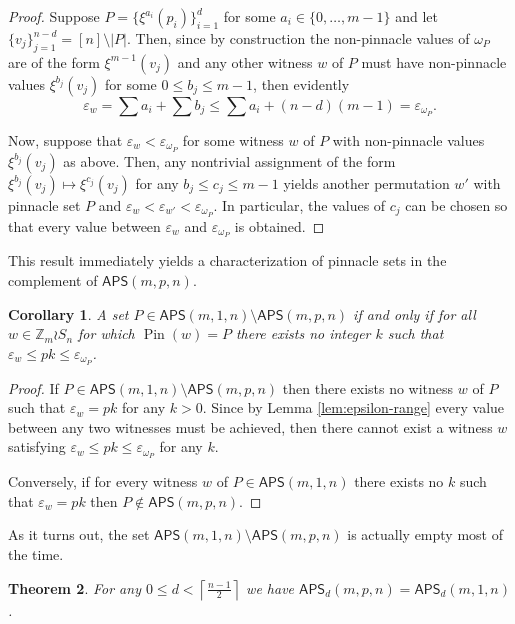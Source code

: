 \documentclass[12pt,reqno]{amsart}
\numberwithin{equation}{section}
\theoremstyle{plain}
\newtheorem{theorem}{Theorem}[section]
\newtheorem{corollary}[theorem]{Corollary}
\theoremstyle{definition}
\theoremstyle{remark}
\newcommand{\Z}{\mathbb{Z}}
\newcommand{\Pin}{\operatorname{Pin}}
\newcommand\APS{\mathsf{APS}}
\newcommand{\ceil}[1]{\left\lceil#1\right\rceil}
\begin{document}
\begin{proof}
Suppose $P = \{\xi^{a_i}(p_i)\}_{i=1}^d$ for some $a_i \in \{0,\dots,m-1\}$ and let $\{v_j\}_{j=1}^{n-d}=[n]\setminus|P|$. Then, since by construction the non-pinnacle values of $\omega_P$ are of the form $\xi^{m-1}(v_j)$ and any other witness $w$ of $P$ must have non-pinnacle values $\xi^{b_j}(v_j)$ for some $0\leq b_j\leq m-1$, then evidently 
\[\varepsilon_w = \sum a_i + \sum b_j \leq \sum a_i + (n-d)(m-1) = \varepsilon_{\omega_P}.\] 

Now, suppose that $\varepsilon_w < \varepsilon_{\omega_P}$ for some witness $w$ of $P$ with non-pinnacle values $\xi^{b_j}(v_j)$ as above. Then, any nontrivial assignment of the form $\xi^{b_j}(v_j) \mapsto \xi^{c_j}(v_j)$ for any $b_j\leq c_j \leq m-1$ yields another permutation $w'$ with pinnacle set $P$ and $\varepsilon_w < \varepsilon_{w'}<\varepsilon_{\omega_P}$. In particular, the values of $c_j$ can be chosen so that every value between $\varepsilon_w$ and $\varepsilon_{\omega_P}$ is obtained. 
\end{proof}

This result immediately yields a characterization of pinnacle sets in the complement of $\APS(m,p,n)$.

\begin{corollary}
A set $P \in \APS(m,1,n)\setminus\APS(m,p,n)$ if and only if for all $w \in \Z_m \wr S_{n}$ for which $\Pin(w)=P$ there exists no integer $k$ such that $\varepsilon_w \leq pk \leq \varepsilon_{\omega_P}$.
\end{corollary}

\begin{proof}
If $P \in \APS(m,1,n)\setminus\APS(m,p,n)$ then there exists no witness $w$ of $P$ such that $\varepsilon_w =pk$ for any $k>0$. Since by Lemma \ref{lem:epsilon-range} every value between any two witnesses must be achieved, then there cannot exist a witness $w$ satisfying $\varepsilon_w \leq pk \leq \varepsilon_{\omega_P}$ for any $k$. 

Conversely, if for every witness $w$ of $P \in \APS(m,1,n)$ there exists no $k$ such that $\varepsilon_w=pk$ then $P \notin \APS(m,p,n)$.
\end{proof}

As it turns out, the set $\APS(m,1,n)\setminus\APS(m,p,n)$ is actually empty most of the time. 

\begin{theorem} \label{thm:APS-complex-equal}
    For any $0 \leq d  < \ceil{\frac{n-1}{2}}$ we have $\APS_d(m, p, n) = \APS_d(m, 1, n)$.
\end{theorem}
\end{document}
